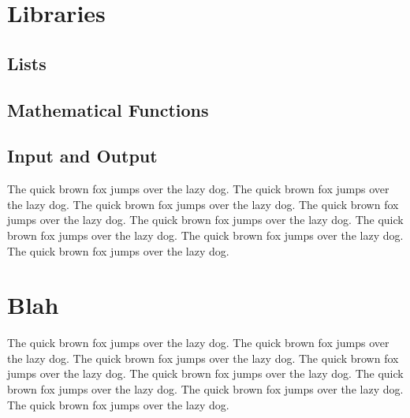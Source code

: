 \documentclass{refcard}
\begin{document}
\section{Libraries}


\subsection{Lists \hfill {}}


\subsection{Mathematical Functions \hfill {}}


\subsection{Input and Output \hfill {}}


The quick brown fox jumps over the lazy dog.
The quick brown fox jumps over the lazy dog.
The quick brown fox jumps over the lazy dog.
The quick brown fox jumps over the lazy dog.
The quick brown fox jumps over the lazy dog.
The quick brown fox jumps over the lazy dog.
The quick brown fox jumps over the lazy dog.
The quick brown fox jumps over the lazy dog.

\section{Blah}

The quick brown fox jumps over the lazy dog.
The quick brown fox jumps over the lazy dog.
The quick brown fox jumps over the lazy dog.
The quick brown fox jumps over the lazy dog.
The quick brown fox jumps over the lazy dog.
The quick brown fox jumps over the lazy dog.
The quick brown fox jumps over the lazy dog.
The quick brown fox jumps over the lazy dog.
\end{document}
